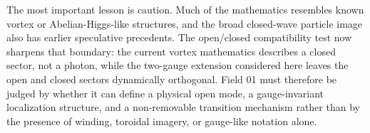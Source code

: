 \documentclass[11pt,a4paper]{article}
\begin{document}
The most important lesson is caution. Much of the mathematics resembles known vortex or Abelian-Higgs-like structures, and the broad closed-wave particle image also has earlier speculative precedents. The open/closed compatibility test now sharpens that boundary: the current vortex mathematics describes a closed sector, not a photon, while the two-gauge extension considered here leaves the open and closed sectors dynamically orthogonal. Field 01 must therefore be judged by whether it can define a physical open mode, a gauge-invariant localization structure, and a non-removable transition mechanism rather than by the presence of winding, toroidal imagery, or gauge-like notation alone.
\end{document}
